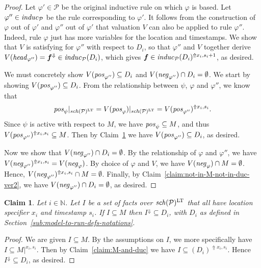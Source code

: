 \documentclass{tlp}
\newtheorem{claim}[theorem]{Claim}
\newcommand{\Nat}{\mathbb{N}}  \newcommand{\len}[1]{|#1|} \newcommand{\rom}[1]{\text{\emph{(#1)}}} \newcommand{\romI}{\rom i}
\newcommand{\ded}{\mathcal{P}}
\newcommand{\fc}{\boldsymbol{f}}
\newcommand{\proj}[2]{#1|_{#2}}
\newcommand{\rl}{\varphi}
\newcommand{\head}[1]{\fname{head}_{#1}}
\newcommand{\bpos}[1]{\fname{pos}_{#1}}
\newcommand{\bneg}[1]{\fname{neg}_{#1}}
\newcommand{\schof}[1]{\fname{sch}(#1)}
\newcommand{\grl}{\psi}
\newcommand{\toloct}[1]{#1^{\mathrm{LT}}}
\newcommand{\addlt}[3]{#1^{\Uparrow#2,#3}}
\newcommand{\projlt}[3]{#1|^{#2,#3}}
\newcommand{\droplt}[1]{#1^{\Downarrow}}
\newcommand{\induc}[1]{\fname{induc}_{#1}}
\newcommand{\mstep}[1]{(#1)}
\begin{document}
\begin{appendix}
\begin{proof}
Let $\rl'\in\ded$ be the original inductive rule on which $\rl$
is based. Let $\rl''\in\induc{\ded}$ be the rule corresponding to
$\rl'$. It follows from the construction of $\rl$ out of $\rl'$
and $\rl''$ out of $\rl'$ that valuation $V$ can also be applied
to rule $\rl''$. Indeed, rule $\rl$ just has more variables for
the location and timestamps. We show that $V$ is satisfying for $\rl''$
with respect to $D_{i}$, so that $\rl''$ and $V$ together derive
$V(\head{\rl''})=\droplt{\fc}\in\induc{\ded}\mstep{D_{i}}$, which
gives $\fc\in\addlt{\induc{\ded}\mstep{D_{i}}}{x_{i}}{s_{i}+1}$, as
desired.

We must concretely show $V(\bpos{\rl''})\subseteq D_{i}$ and $V(\bneg{\rl''})\cap D_{i}=\emptyset$.
We start by showing $V(\bpos{\rl''})\subseteq D_{i}$. From the relationship
between $\grl$, $\rl$ and $\rl''$, we know that 
\[
\proj{\bpos{\grl}}{\toloct{\schof{\ded}}}=\proj{V(\bpos{\rl})}{\toloct{\schof{\ded}}}=\addlt{V(\bpos{\rl''})}{x_{i}}{s_{i}}.
\]
Since $\grl$ is active with respect to $M$, we have $\bpos{\grl}\subseteq M$,
and thus $\addlt{V(\bpos{\rl''})}{x_{i}}{s_{i}}\subseteq M$. Then
by Claim~\ref{claim:in-M-in-duc-ver2} we have $V(\bpos{\rl''})\subseteq D_{i}$,
as desired.

Now we show that $V(\bneg{\rl''})\cap D_{i}=\emptyset$. By the relationship
of $\rl$ and $\rl''$, we have $\addlt{V(\bneg{\rl''})}{x_{i}}{s_{i}}=V(\bneg{\rl})$.
By choice of $\rl$ and $V$, we have $V(\bneg{\rl})\cap M=\emptyset$.
Hence, $\addlt{V(\bneg{\rl''})}{x_{i}}{s_{i}}\cap M=\emptyset$. Finally,
by Claim~\ref{claim:not-in-M-not-in-duc-ver2}, we have $V(\bneg{\rl''})\cap D_{i}=\emptyset$,
as desired.\end{proof}



\tline



\begin{claim}\label{claim:in-M-in-duc-ver2}Let $i\in\Nat$. Let
$I$ be a set of facts over $\toloct{\schof{\ded}}$ that all have
location specifier $x_{i}$ and timestamp $s_{i}$. If $I\subseteq M$
then $\droplt I\subseteq D_{i}$, with $D_{i}$ as defined in Section~\ref{sub:model-to-run-defs-notations}.\end{claim}

\begin{proof}

We are given $I\subseteq M$. By the assumptions on $I$, we more
specifically have $I\subseteq\projlt M{x_{i}}{s_{i}}$. Then by Claim~\ref{claim:M-and-duc}
we have $I\subseteq\addlt{(D_{i})}{x_{i}}{s_{i}}$. Hence $\droplt I\subseteq D_{i}$,
as desired.\end{proof}




\end{appendix}
\end{document}
